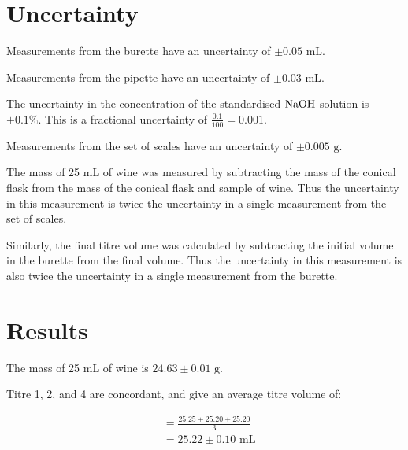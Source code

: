\documentclass[a4paper,11pt]{article}
\begin{document}
\section{Uncertainty}

Measurements from the burette have an uncertainty of $\pm 0.05\mbox{ mL}$.

Measurements from the pipette have an uncertainty of $\pm 0.03\mbox{ mL}$.

The uncertainty in the concentration of the standardised $\ce{NaOH}$ solution
is $\pm 0.1\%$. This is a fractional uncertainty of $\frac{0.1}{100} = 0.001$.

Measurements from the set of scales have an uncertainty of
$\pm 0.005\mbox{ g}$.

The mass of 25 mL of wine was measured by subtracting the mass of the conical
flask from the mass of the conical flask and sample of wine. Thus the
uncertainty in this measurement is twice the uncertainty in a single
measurement from the set of scales.

Similarly, the final titre volume was calculated by subtracting the initial
volume in the burette from the final volume. Thus the uncertainty in this
measurement is also twice the uncertainty in a single measurement from the
burette.


\section{Results}

The mass of 25 mL of wine is $24.63 \pm 0.01\mbox{ g}$.


Titre 1, 2, and 4 are concordant, and give an average titre volume of:

$$
\begin{aligned}
& = \frac{25.25 + 25.20 + 25.20}{3} \\
& = 25.22 \pm 0.10 \mbox{ mL} \\
\end{aligned}
$$
\end{document}
